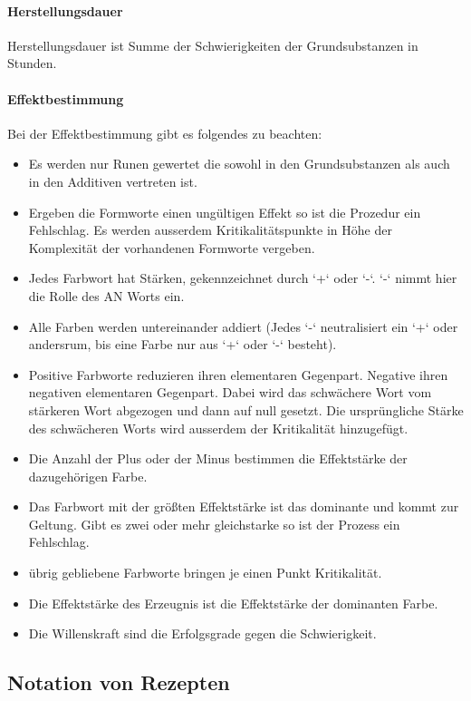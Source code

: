 \documentclass{article}
\begin{document}
\paragraph{Herstellungsdauer}

Herstellungsdauer ist Summe der Schwierigkeiten der Grundsubstanzen in Stunden.

\paragraph{Effektbestimmung}

Bei der Effektbestimmung gibt es folgendes zu beachten:

\begin{itemize}
\item Es werden nur Runen gewertet die sowohl in den Grundsubstanzen als auch in den Additiven vertreten ist.
\item Ergeben die Formworte einen ungültigen Effekt so ist die Prozedur ein Fehlschlag. Es werden ausserdem Kritikalitätspunkte in Höhe der Komplexität der vorhandenen Formworte vergeben.
\item Jedes Farbwort hat Stärken, gekennzeichnet durch `+` oder `-`. `-` nimmt hier die Rolle des AN Worts ein.
\item Alle Farben werden untereinander addiert (Jedes `-` neutralisiert ein `+` oder andersrum, bis eine Farbe nur aus `+` oder  `-` besteht).
\item Positive Farbworte reduzieren ihren elementaren Gegenpart. Negative ihren negativen elementaren Gegenpart. Dabei wird das schwächere Wort vom stärkeren Wort abgezogen und dann auf null gesetzt. Die ursprüngliche Stärke des schwächeren Worts wird ausserdem der Kritikalität hinzugefügt.
\item Die Anzahl der Plus oder der Minus bestimmen die Effektstärke der dazugehörigen Farbe.
\item Das Farbwort mit der größten Effektstärke ist das dominante und kommt zur Geltung. Gibt es zwei oder mehr gleichstarke so ist der Prozess ein Fehlschlag.
\item übrig gebliebene Farbworte bringen je einen Punkt Kritikalität.
\item Die Effektstärke des Erzeugnis ist die Effektstärke der dominanten Farbe.
\item Die Willenskraft sind die Erfolgsgrade gegen die Schwierigkeit.
\end{itemize}

\begin{center}
\subsection{Notation von Rezepten}
\end{center}
\end{document}
